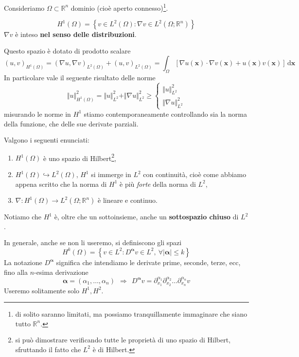 \documentclass[10pt,a4paper,twoside,openright]{book}
\newcommand{\x}{\mathbf{x}}
\newcommand{\de}{\,\mathrm d}
\newcommand{\dxx}{\de \x}
\begin{document}
Consideriamo $\Omega \subset \mathbb{R}^{n}$ dominio (cioè aperto connesso)\footnote{di solito saranno limitati, ma possiamo tranquillamente immaginare che siano tutto $\mathbb{R}^{n}$.}.
\begin{definition}
	\begin{equation*}
		H^{1}(\Omega) =\left\{v\in L^{2}(\Omega) :\nabla v\in L^{2}\left(\Omega ;\mathbb{R}^{n}\right)\right\}
	\end{equation*}
	$\nabla v$ è inteso \textbf{nel senso delle distribuzioni}.
\end{definition}
Questo spazio è dotato di prodotto scalare
\begin{equation*}
	(u,v)_{H^{1}(\Omega)} =(\nabla u,\nabla v)_{L^{2}(\Omega)} +(u,v)_{L^{2}(\Omega)} =\int _{\Omega }[ \nabla u(\x) \cdotp \nabla v(\x) +u(\x) v(\x)] \dxx
\end{equation*}
In particolare vale il seguente risultato delle norme
\begin{equation*}
	\Vert u\Vert ^{2}_{H^{1}(\Omega)} =\Vert u\Vert ^{2}_{L^{2}} +\Vert \nabla u\Vert ^{2}_{L^{2}} \geqslant \begin{cases}
	\Vert u\Vert ^{2}_{L^{2}}\\
	\Vert \nabla u\Vert ^{2}_{L^{2}}
	\end{cases}
\end{equation*}
misurando le norme in $H^{1}$ stiamo contemporaneamente controllando sia la norma della funzione, che delle sue derivate parziali.
\begin{theorem}
	[Microteorema]
	Valgono i seguenti enunciati:
	\begin{enumerate}
		\item $H^{1}(\Omega)$ è uno spazio di Hilbert\footnote{si può dimostrare verificando tutte le proprietà di uno spazio di Hilbert, sfruttando il fatto che $L^{2}$ è di Hilbert.},
		\item $H^{1}(\Omega) \hookrightarrow L^{2}(\Omega)$, $H^{1}$ si immerge in $L^{2}$ con continuità, cioè come abbiamo appena scritto che la norma di $H^{1}$ è più \textit{forte} della norma di $L^{2}$,
		\item $\nabla :H^{1}(\Omega)\rightarrow L^{2}\left(\Omega ;\mathbb{R}^{n}\right)$ è lineare e continuo.
	\end{enumerate}
\end{theorem}

Notiamo che $H^{1}$ è, oltre che un sottoinsieme, anche un \textbf{sottospazio chiuso} di $L^{2}$.

In generale, anche se non li useremo, si definiscono gli spazi
\begin{equation*}
	H^{k}(\Omega) =\left\{v\in L^{2} :D^{\bm{\alpha}} v\in L^{2} ,\ \forall | \bm{\alpha}| \leqslant k\right\}
\end{equation*}
La notazione $D^{\bm{\alpha}}$ significa che intendiamo le derivate prime, seconde, terze, ecc, fino alla $n$-esima derivazione
\begin{equation*}
	\bm{\alpha} =(\alpha _{1} ,\dotsc ,\alpha _{n}) \ \ \Rightarrow \ \ D^{\bm{\alpha}} v=\partial ^{\alpha _{1}}_{x_{1}} \partial ^{\alpha _{2}}_{x_{2}} \dotsc \partial ^{\alpha _{n}}_{x_{n}} v
\end{equation*}
Useremo solitamente solo $H^{1} ,H^{2}$.
\end{document}
